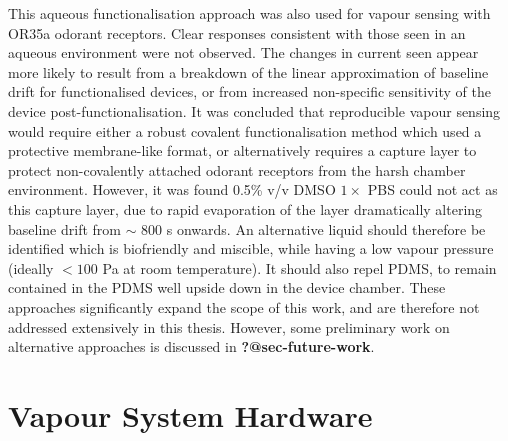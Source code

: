 \documentclass[
  a4paper,
]{scrbook}
\begin{document}
This aqueous functionalisation approach was also used for vapour sensing
with OR35a odorant receptors. Clear responses consistent with those seen
in an aqueous environment were not observed. The changes in current seen
appear more likely to result from a breakdown of the linear
approximation of baseline drift for functionalised devices, or from
increased non-specific sensitivity of the device post-functionalisation.
It was concluded that reproducible vapour sensing would require either a
robust covalent functionalisation method which used a protective
membrane-like format, or alternatively requires a capture layer to
protect non-covalently attached odorant receptors from the harsh chamber
environment. However, it was found 0.5\% v/v DMSO \(1 \times\) PBS could
not act as this capture layer, due to rapid evaporation of the layer
dramatically altering baseline drift from \(\sim\) 800 s onwards. An
alternative liquid should therefore be identified which is biofriendly
and miscible, while having a low vapour pressure (ideally \(< 100\) Pa
at room temperature). It should also repel PDMS, to remain contained in
the PDMS well upside down in the device chamber. These approaches
significantly expand the scope of this work, and are therefore not
addressed extensively in this thesis. However, some preliminary work on
alternative approaches is discussed in \textbf{?@sec-future-work}.

\cleardoublepage
{}
{}
\appendix

\hypertarget{sec-vapour-sensor-components}{%
\chapter{Vapour System Hardware}\label{sec-vapour-sensor-components}}
\end{document}
